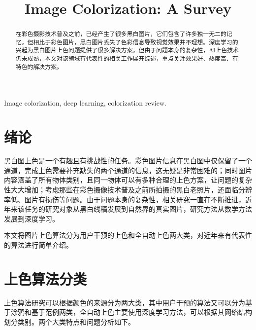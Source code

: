 \documentclass[conference]{IEEEtran}
\begin{document}
\title{Image Colorization: A Survey\\
}
\author{ 
}

\maketitle
\thispagestyle{fancy}
\pagestyle{fancy}
\rfoot{}
      \renewcommand{\headrulewidth}{0pt}
      \renewcommand{\footrulewidth}{0pt}
\begin{abstract}
    在彩色摄影技术普及之前，已经产生了很多黑白图片，它们包含了许多独一无二的记忆。但相比于彩色图片，黑白图片丢失了色彩信息导致视觉效果并不理想。深度学习的兴起为黑白图片上色问题提供了很多解决方案，但由于问题本身的复杂性，AI上色技术仍未成熟，本文对该领域有代表性的相关工作展开综述，重点关注效果好、热度高、有特色的解决方案。
\end{abstract}

\begin{IEEEkeywords}
    Image colorization, deep learning, colorization review.
\end{IEEEkeywords}

\section{绪论}
黑白图上色是一个有趣且有挑战性的任务。彩色图片信息在黑白图中仅保留了一个通道，完成上色需要补充缺失的两个通道的信息，这无疑是非常困难的；同时图片内容涵盖了所有物体类别，且同一物体可以有多种合理的上色方案，让问题的复杂性大大增加\cite{anwar2020image}；考虑那些在彩色摄像技术普及之前所拍摄的黑白老照片，还面临分辨率低、图片有损伤等问题。由于问题本身的复杂性，相关研究一直在不断推进，近年来该任务的研究对象从黑白线稿发展到自然界的真实图片，研究方法从数学方法发展到深度学习。

本文将图片上色算法分为用户干预的上色和全自动上色两大类，对近年来有代表性的算法进行简单介绍。

\section{上色算法分类}
上色算法研究可以根据颜色的来源分为两大类，其中用户干预的算法又可以分为基于涂鸦和基于范例两类，全自动上色主要使用深度学习方法，可以根据其网络结构划分类别。两个大类特点和问题分析如下。
\end{document}
